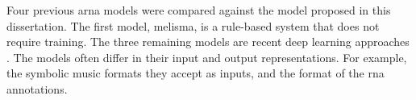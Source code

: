 
Four previous \gls{arna} models were compared against the
model proposed in this dissertation. The first model,
\gls{melisma}, is a rule-based system that does not require
training. The three remaining models are recent deep
learning approaches \parencite{chen2021attend,
micchi2021deep, mcleod2021modular}. The models often differ
in their input and output representations. For example, the
symbolic music formats they accept as inputs, and the format
of the \gls{rna} annotations. 


